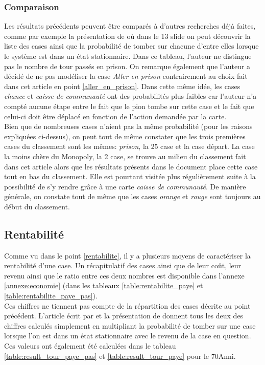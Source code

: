 \documentclass[letterpaper]{article}
\begin{document}
    \subsubsection{Comparaison}
      Les résultats précédents peuvent être comparés à d'autres recherches déjà faites,
      comme par exemple la présentation de \cite{PP_MONOPOLY} où dans le 13 slide
      on peut découvrir la liste des cases ainsi que la probabilité de tomber sur
      chacune d'entre elles lorsque le système est dans un état stationnaire.  Dans ce tableau, l'auteur
      ne distingue pas le nombre de tour passés en prison.  On remarque également
      que l'auteur a décidé de ne pas modéliser la case \textit{Aller en prison}
      contrairement au choix fait dans cet article en point \ref{aller_en_prison}.
      Dans cette même idée, les cases \textit{chance} et \textit{caisse de communauté}
      ont des probabilités plus faibles car l'auteur n'a compté aucune étape entre
      le fait que le pion tombe sur cette case et le fait que celui-ci doit être
      déplacé en fonction de l'action demandée par la carte.\\
      Bien que de nombreuses cases n'aient pas la même probabilité (pour les raisons
      expliquées ci-dessus), on peut tout de même constater que les trois premières cases
      du classement sont les mêmes: \textit{prison}, la 25 case et la case départ.
      La case la moins chère du Monopoly, la 2 case, se trouve au milieu du classement
      fait dans cet article alors que les résultats présents dans le document
      place cette case tout en bas du classement.  Elle est pourtant visitée plus régulièrement
      suite à la possibilité de s'y rendre grâce à une carte \textit{caisse de communauté}.
      De manière générale, on constate tout de même que les cases \textit{orange} et
      \textit{rouge} sont toujours au début du classement.

  \subsection{Rentabilité}
    Comme vu dans le point \ref{rentabilite}, il y a plusieurs moyens
    de caractériser la rentabilité d'une case.  Un récapitulatif des cases
    ainsi que de leur coût, leur revenu ainsi que le ratio entre ces deux nombres
    est disponible dans l'annexe \ref{annexe:economie} (dans les tableaux
    \ref{table:rentabilite_paye} et \ref{table:rentabilite_paye_pas}).\\
    Ces chiffres ne tiennent pas compte de la répartition des cases décrite au
    point précédent.  L'article écrit par \cite{MONOPOLY_ARTICLE} et la
    présentation de \cite{PP_MONOPOLY} donnent tous les deux des chiffres
    calculés simplement en multipliant la probabilité de tomber sur une
    case lorsque l'on est dans un état stationnaire avec le revenu de la case
    en question.  Ces valeurs ont également été calculées dans le tableau
    \ref{table:result_tour_paye_pas} et \ref{table:result_tour_paye} pour
    le \monopoly70Anni.
\end{document}
